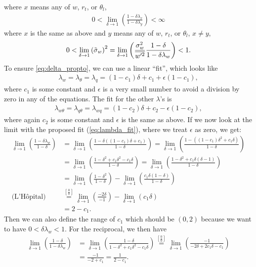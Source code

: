where $x$ means any of $w$, $r_t$, or $\theta_l$,
\begin{align}
    0 < \lim_{\delta\to 1} \left(\frac{1-\delta\lambda_x}{1-\delta\lambda_y}\right) < \infty
\end{align}
where $x$ is the same as above and $y$ means any of $w$, $r_t$, or $\theta_l$, $x \neq y$,
\begin{align}
    0 < \lim_{\delta \to 1} \left({\tilde{\sigma}_w}\right)^2
    = \lim_{\delta \to 1} \left(\frac{\sigma_w^2}{\overline{w'^2}} \frac{1-\delta}{1-\delta \lambda_w}\right) < 1.
\end{align}
To ensure \cref{eq:delta_propto}, we can use a linear \enquote{fit}, which looks like
\begin{align}
    \label{eq:lambda_fit}
    \lambda_w = \lambda_\theta = \lambda_q
    = (1 - c_1) \delta + c_1 + \epsilon (1 - c_1),
\end{align}
where $c_1$ is some constant and $\epsilon$ is a very small number to avoid a division by zero in any of the equations.
The fit for the other $\lambda$'s is
\begin{align}
    \label{eq:lambda_xy_fit}
    \lambda_{w\theta} = \lambda_{q\theta} = \lambda_{wq}
    = (1 - c_2) \delta + c_2 - \epsilon (1 - c_2),
\end{align}
where again $c_2$ is some constant and $\epsilon$ is the same as above.
If we now look at the limit with the proposed fit (\cref{eq:lambda_fit}), where we treat $\epsilon$ as zero, we get:
\begin{align}
    \lim_{\delta \to 1} \left(\frac{1 - \delta\lambda_w}{1 - \delta}\right)
    &= \lim_{\delta \to 1} \left(\frac{1 - \delta((1 - c_1) \delta + c_1)}{1 - \delta}\right)
    = \lim_{\delta \to 1} \left(\frac{1 - ((1 - c_1) \delta^2 + c_1\delta)}{1 - \delta}\right) \\
    &= \lim_{\delta \to 1} \left(\frac{1 - \delta^2 + c_1\delta^2 - c_1\delta}{1 - \delta}\right)
    = \lim_{\delta \to 1} \left(\frac{1 - \delta^2 + c_1\delta(\delta - 1)}{1 - \delta}\right) \\
    &= \lim_{\delta \to 1} \left(\frac{1 - \delta^2}{1 - \delta}\right)
    - \lim_{\delta \to 1} \left(\frac{c_1\delta(1 - \delta)}{1 - \delta}\right) \\
    \text{(L'Hôpital)}
    &\overset{\left[\frac{0}{0}\right]}{=} \lim_{\delta \to 1} \left(\frac{-2\delta}{-1}\right)
    - \lim_{\delta \to 1} \left(c_1\delta\right) \\
    &= 2 - c_1.
\end{align}
Then we can also define the range of $c_1$ which should be $(0, 2)$ because we want to have $0 < \delta\lambda_w < 1$.
For the reciprocal, we then have
\begin{align}
    \lim_{\delta \to 1} \left(\frac{1 - \delta}{1 - \delta\lambda_w}\right)
    &= \lim_{\delta \to 1} \left(\frac{1 - \delta}{1 - \delta^2 + c_1\delta^2 - c_1\delta}\right)
    \overset{\left[\frac{0}{0}\right]}{=} \lim_{\delta \to 1} \left(\frac{-1}{- 2\delta + 2c_1\delta - c_1}\right) \\
    &= \frac{-1}{-2 + c_1} = \frac{1}{2 - c_1}.
\end{align}


